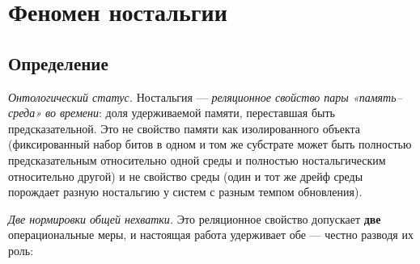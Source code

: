 \documentclass[pdflatex,sn-mathphys-ay]{sn-jnl}
\begin{document}
\section{Феномен ностальгии}\label{ux444ux435ux43dux43eux43cux435ux43d-ux43dux43eux441ux442ux430ux43bux44cux433ux438ux438}



\subsection{Определение}\label{ux43eux43fux440ux435ux434ux435ux43bux435ux43dux438ux435}



\emph{Онтологический статус.} Ностальгия --- \emph{реляционное свойство пары «память--среда» во времени}: доля удерживаемой памяти, переставшая быть предсказательной. Это не свойство памяти как изолированного объекта (фиксированный набор битов в одном и том же субстрате может быть полностью предсказательным относительно одной среды и полностью ностальгическим относительно другой) и не свойство среды (один и тот же дрейф среды порождает разную ностальгию у систем с разным темпом обновления).



\emph{Две нормировки общей нехватки.} Это реляционное свойство допускает \textbf{две} операциональные меры, и настоящая работа удерживает обе --- честно разводя их роль:
\end{document}
